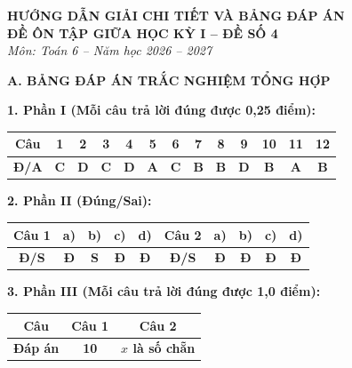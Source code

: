 \documentclass[12pt,a4paper]{article}
\begin{document}
\begin{center}
  \textbf{\Large HƯỚNG DẪN GIẢI CHI TIẾT VÀ BẢNG ĐÁP ÁN}\\
  \textbf{\large ĐỀ ÔN TẬP GIỮA HỌC KỲ I -- ĐỀ SỐ 4}\\
  \textit{Môn: Toán 6 -- Năm học 2026 -- 2027}
\end{center}
\vspace{2mm}

\noindent\textbf{\large A. BẢNG ĐÁP ÁN TRẮC NGHIỆM TỔNG HỢP}
\vspace{1.5mm}

\noindent\textbf{1. Phần I (Mỗi câu trả lời đúng được 0,25 điểm):}
\begin{center}
\begin{tabular}{|c|c|c|c|c|c|c|c|c|c|c|c|c|}
\hline
\textbf{Câu} & \textbf{1} & \textbf{2} & \textbf{3} & \textbf{4} & \textbf{5} & \textbf{6} & \textbf{7} & \textbf{8} & \textbf{9} & \textbf{10} & \textbf{11} & \textbf{12} \\
\hline
\textbf{Đ/A} & \textbf{C} & \textbf{D} & \textbf{C} & \textbf{D} & \textbf{A} & \textbf{C} & \textbf{B} & \textbf{B} & \textbf{D} & \textbf{B} & \textbf{A} & \textbf{B} \\
\hline
\end{tabular}
\end{center}
\vspace{1mm}

\noindent\textbf{2. Phần II (Đúng/Sai):}
\begin{center}
\begin{tabular}{|c|c|c|c|c||c|c|c|c|c|}
\hline
\textbf{Câu 1} & \textbf{a)} & \textbf{b)} & \textbf{c)} & \textbf{d)} & \textbf{Câu 2} & \textbf{a)} & \textbf{b)} & \textbf{c)} & \textbf{d)} \\
\hline
\textbf{Đ/S} & \textbf{Đ} & \textbf{S} & \textbf{Đ} & \textbf{Đ} & \textbf{Đ/S} & \textbf{Đ} & \textbf{Đ} & \textbf{Đ} & \textbf{Đ} \\
\hline
\end{tabular}
\end{center}
\vspace{1mm}

\noindent\textbf{3. Phần III (Mỗi câu trả lời đúng được 1,0 điểm):}
\begin{center}
\begin{tabular}{|c|c|c|}
\hline
\textbf{Câu} & \textbf{Câu 1} & \textbf{Câu 2} \\
\hline
\textbf{Đáp án} & \textbf{10} & \textbf{$x$ là số chẵn} \\
\hline
\end{tabular}
\end{center}
\vspace{3mm}
\end{document}
